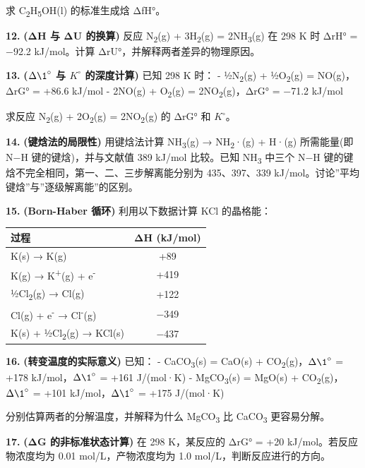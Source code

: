 求 C\textsubscript{2}H\textsubscript{5}OH(l) 的标准生成焓 ΔfH°。

\textbf{12.} \textbf{(ΔH 与 ΔU 的换算)} 反应 N\textsubscript{2}(g) + 3H\textsubscript{2}(g) = 2NH\textsubscript{3}(g) 在 298 K 时 ΔrH° = −92.2 kJ/mol。计算 ΔrU°，并解释两者差异的物理原因。

\textbf{13.} \textbf{(\(\Delta \1^{\circ}\) 与 \(K^{\circ}\) 的深度计算)} 已知 298 K 时：
- ½N\textsubscript{2}(g) + ½O\textsubscript{2}(g) = NO(g)，ΔrG° = +86.6 kJ/mol
- 2NO(g) + O\textsubscript{2}(g) = 2NO\textsubscript{2}(g)，ΔrG° = −71.2 kJ/mol

求反应 N\textsubscript{2}(g) + 2O\textsubscript{2}(g) = 2NO\textsubscript{2}(g) 的 ΔrG° 和 \(K^{\circ}\)。

\textbf{14.} \textbf{(键焓法的局限性)} 用键焓法计算 NH\textsubscript{3}(g) → NH\textsubscript{2}·(g) + H·(g) 所需能量(即 N−H 键的键焓)，并与文献值 389 kJ/mol 比较。已知 NH\textsubscript{3} 中三个 N−H 键的键焓不完全相同，第一、二、三步解离能分别为 435、397、339 kJ/mol。讨论''平均键焓''与''逐级解离能''的区别。

\textbf{15.} \textbf{(Born-Haber 循环)} 利用以下数据计算 KCl 的晶格能：

{\def\LTcaptype{none} %
\begin{longtable}[]{@{}lc@{}}
\toprule\noalign{}
过程 & ΔH (kJ/mol) \\
\midrule\noalign{}
\endhead
\bottomrule\noalign{}
\endlastfoot
K(s) → K(g) & +89 \\
K(g) → K\textsuperscript{+}(g) + e\textsuperscript{-} & +419 \\
½Cl\textsubscript{2}(g) → Cl(g) & +122 \\
Cl(g) + e\textsuperscript{-} → Cl\textsuperscript{-}(g) & −349 \\
K(s) + ½Cl\textsubscript{2}(g) → KCl(s) & −437 \\
\end{longtable}
}

\textbf{16.} \textbf{(转变温度的实际意义)} 已知：
- CaCO\textsubscript{3}(s) = CaO(s) + CO\textsubscript{2}(g)，\(\Delta \1^{\circ}\) = +178 kJ/mol，\(\Delta \1^{\circ}\) = +161 J/(mol·K)
- MgCO\textsubscript{3}(s) = MgO(s) + CO\textsubscript{2}(g)，\(\Delta \1^{\circ}\) = +101 kJ/mol，\(\Delta \1^{\circ}\) = +175 J/(mol·K)

分别估算两者的分解温度，并解释为什么 MgCO\textsubscript{3} 比 CaCO\textsubscript{3} 更容易分解。

\textbf{17.} \textbf{(ΔG 的非标准状态计算)} 在 298 K，某反应的 ΔrG° = +20 kJ/mol。若反应物浓度均为 0.01 mol/L，产物浓度均为 1.0 mol/L，判断反应进行的方向。

